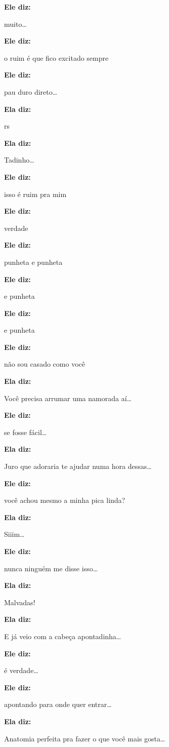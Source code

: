 \textbf{Ele diz:}

muito…

\textbf{Ele diz:}

o ruim é que fico excitado sempre

\textbf{Ele diz:}

pau duro direto…

\textbf{Ela diz:}

rs

\textbf{Ela diz:}

Tadinho…

\textbf{Ele diz:}

isso é ruim pra mim

\textbf{Ele diz:}

verdade

\textbf{Ele diz:}

punheta e punheta

\textbf{Ele diz:}

e punheta

\textbf{Ele diz:}

e punheta

\textbf{Ele diz:}

não sou casado como você

\textbf{Ela diz:}

Você precisa arrumar uma namorada aí…

\textbf{Ele diz:}

se fosse fácil…

\textbf{Ela diz:}

Juro que adoraria te ajudar numa hora dessas…

\textbf{Ele diz:}

você achou mesmo a minha pica linda?

\textbf{Ela diz:}

Siiim…

\textbf{Ele diz:}

nunca ninguém me disse isso…

\textbf{Ela diz:}

Malvadas!

\textbf{Ela diz:}

E já veio com a cabeça apontadinha…

\textbf{Ele diz:}

é verdade…

\textbf{Ele diz:}

apontando para onde quer entrar…

\textbf{Ela diz:}

Anatomia perfeita pra fazer o que você mais gosta…


